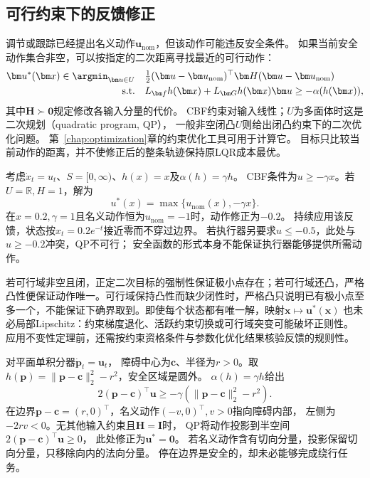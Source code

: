 \subsection{可行约束下的反馈修正}
调节或跟踪已经提出名义动作$\bm u_{\mathrm{nom}}$，但该动作可能违反安全条件。
如果当前安全动作集合非空，可以按指定的二次距离寻找最近的可行动作：
\begin{equation}
  \begin{aligned}
  \bm u^\ast(\bm x)\in\argmin_{\bm u\in U}\quad&
    \tfrac12(\bm u-\bm u_{\mathrm{nom}})^\top
              \bm H(\bm u-\bm u_{\mathrm{nom}})\\
  \text{s.t.}\quad&
    L_{\bm f}h(\bm x)+L_{\bm G}h(\bm x)\bm u
       \geq-\alpha(h(\bm x)),
  \end{aligned}
  \label{eq:control-cbf-qp}
\end{equation}
其中$\bm H\succ\bm0$规定修改各输入分量的代价。
CBF约束对输入线性；$U$为多面体时这是二次规划（quadratic program, QP），
一般非空闭凸$U$则给出闭凸约束下的二次优化问题。
第~\ref{chap:optimization}章的约束优化工具可用于计算它。
目标只比较当前动作的距离，并不使修正后的整条轨迹保持原LQR成本最优。

\begin{example}[一维积分器上的安全投影]
\label{ex:control-cbf-scalar-projection}
考虑$\dot x_t=u_t$、$S=[0,\infty)$、$h(x)=x$及$\alpha(h)=\gamma h$。
CBF条件为$u\geq-\gamma x$。若$U=\mathbb R,H=1$，解为
\begin{equation}
  u^\ast(x)=\max\{u_{\mathrm{nom}}(x),-\gamma x\}.
  \label{eq:control-cbf-scalar-projection}
\end{equation}
在$x=0.2,\gamma=1$且名义动作恒为$u_{\mathrm{nom}}=-1$时，动作修正为$-0.2$。
持续应用该反馈，状态按$x_t=0.2e^{-t}$接近零而不穿过边界。
若执行器另要求$u\leq-0.5$，此处与$u\geq-0.2$冲突，QP不可行；
安全函数的形式本身不能保证执行器能够提供所需动作。
\end{example}

若可行域非空且闭，正定二次目标的强制性保证极小点存在；若可行域还凸，严格凸性便保证动作唯一。可行域保持凸性而缺少闭性时，严格凸只说明已有极小点至多一个，不能保证下确界取到。即使每个状态都有唯一解，映射$\bm x\mapsto\bm u^\ast(\bm x)$
也未必局部Lipschitz：约束梯度退化、活跃约束切换或可行域突变可能破坏正则性。
应用不变性定理前，还需按约束资格条件与参数化优化结果核验反馈的规则性。

\begin{example}[圆形障碍外的安全修正]
\label{ex:control-cbf-obstacle}
对平面单积分器$\dot{\bm p}_t=\bm u_t$，
障碍中心为$\bm c$、半径为$r>0$。取
$h(\bm p)=\|\bm p-\bm c\|_2^2-r^2$，安全区域是圆外。
$\alpha(h)=\gamma h$给出
\begin{equation}
  2(\bm p-\bm c)^\top\bm u
  \geq-\gamma(\|\bm p-\bm c\|_2^2-r^2).
  \label{eq:control-cbf-obstacle-constraint}
\end{equation}
在边界$\bm p-\bm c=(r,0)^\top$，名义动作$(-v,0)^\top,v>0$指向障碍内部，
左侧为$-2rv<0$。无其他输入约束且$\bm H=\bm I$时，
QP将动作投影到半空间$2(\bm p-\bm c)^\top\bm u\geq0$，
此处修正为$\bm u^\ast=\bm0$。
若名义动作含有切向分量，投影保留切向分量，只移除向内的法向分量。
停在边界是安全的，却未必能够完成绕行任务。
\end{example}

